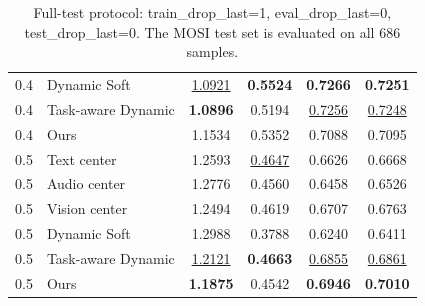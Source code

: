 \begin{table}[t]
\begin{tabular}{c l c c c c}
0.4 & Dynamic Soft & \underline{1.0921} & \textbf{0.5524} & \textbf{0.7266} & \textbf{0.7251} \\ 
0.4 & Task-aware Dynamic & \textbf{1.0896} & 0.5194 & \underline{0.7256} & \underline{0.7248} \\ 
0.4 & Ours & 1.1534 & 0.5352 & 0.7088 & 0.7095 \\ 
0.5 & Text center & 1.2593 & \underline{0.4647} & 0.6626 & 0.6668 \\ 
0.5 & Audio center & 1.2776 & 0.4560 & 0.6458 & 0.6526 \\ 
0.5 & Vision center & 1.2494 & 0.4619 & 0.6707 & 0.6763 \\ 
0.5 & Dynamic Soft & 1.2988 & 0.3788 & 0.6240 & 0.6411 \\ 
0.5 & Task-aware Dynamic & \underline{1.2121} & \textbf{0.4663} & \underline{0.6855} & \underline{0.6861} \\ 
0.5 & Ours & \textbf{1.1875} & 0.4542 & \textbf{0.6946} & \textbf{0.7010} \\ 
\bottomrule
\end{tabular}
\caption{Full-test protocol: train_drop_last=1, eval_drop_last=0, test_drop_last=0. The MOSI test set is evaluated on all 686 samples.}
\label{tab:residual_main_compact}
\end{table}
